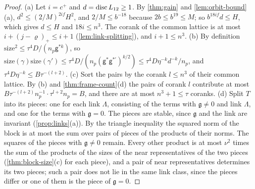 \begin{proof}
(a) Let $i=c^+$ and $d=\operatorname{disc} L_{12}\ge1$. By \cref{thm:gain} and \cref{lem:orbit-bound}(a), $d^2\le(2/M)^{2if}H^2$, and $2/M\le b^{-18}$ because $2b\le b^{19}\le M$; so $b^{18if}d\le H$, which gives $d\le H$ and $18i\le n^3$. The corank of the common
lattice is at most $i+(j-\varrho)_+\le i+1$ (\cref{lem:link-splitting}), and $i+1\le n^3$.
(b) By definition $\mathrm{size}^2\le\tau^4D/(n_p\mathsf g^{*k})$, so $\mathrm{size}(\gamma)\mathrm{size}(\gamma')\le\tau^4D/(n_p(\mathsf g^*\mathsf g^{*\prime})^{k/2})\le\tau^4D\eta^{-k}d^{-k}/n_p$, and $\tau^4D\eta^{-k}\le B\tau^{-(l+2)}$.
(c) Sort the pairs by the corank $l\le n^3$ of their common lattice. By (b) and \cref{thm:frame-count}(d) the pairs of corank $l$ contribute at most $B\tau^{-(l+2)}n_p^{-1}\cdot\tau^{l+2}n_p=B$, and there are at most $n^3+1\le\tau$ coranks.
(d) Split $T$ into its pieces: one for each link $\Lambda$, consisting of the terms with $\mathfrak g\ne0$ and link $\Lambda$, and one for the terms with $\mathfrak g=0$. The pieces are stable, since $\mathfrak g$ and the link are invariant
(\cref{prop:links}(a)). By the triangle inequality the squared norm of the block is at most the sum over pairs of pieces of the products of their norms. The squares of the pieces with $\mathfrak g\ne0$ remain. Every other
product is at most $\nu^2$ times the sum of the products of the sizes of the near representatives of the two pieces (\cref{thm:block-size}(c) for each piece), and a pair of near representatives determines its two pieces;
such a pair does not lie in the same link class, since the pieces differ or one of them is the piece of $\mathfrak g=0$.
\end{proof}

